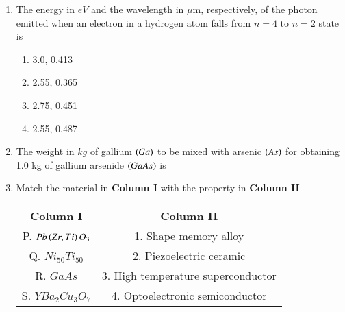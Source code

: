\documentclass[journal,12pt,onecolumn]{IEEEtran}
\theoremstyle{remark}
\begin{document}
\begin{enumerate}
    \item The energy in $eV$ and the wavelength in $\mu$m, respectively, of the photon emitted when an electron
        in a hydrogen atom falls from $n = 4$ to $n = 2$ state is
        \hfill{}
        \begin{multicols}{4}
            \begin{enumerate}
                \item  3.0, 0.413 \columnbreak
                \item  2.55, 0.365 \columnbreak
                \item  2.75, 0.451  \columnbreak
                \item  2.55, 0.487
            \end{enumerate}
        \end{multicols}

    \item  The weight in $kg$ of gallium $\left(Ga\right)$ to be mixed with arsenic $\left(As\right)$ for obtaining 1.0 kg of gallium
        arsenide $\left(GaAs\right)$ is
        \hfill{}

    \item Match the material in \textbf{Column I} with the property in \textbf{Column II}
        \begin{center}
            \begin{tabular}{| c | c |}
        \hline
                \textbf{Column I} & \textbf{Column II}\\
                P. $Pb\left(Zr, Ti\right)O_3$ & 1. Shape memory alloy\\
                \hline
                Q. $Ni_{50}Ti_{50} $ & 2. Piezoelectric ceramic\\
                \hline
                R. $GaAs$ & 3. High temperature superconductor\\
                \hline
                S. $YBa_2Cu_3O_7$ & 4. Optoelectronic semiconductor\\
        \hline
           \end{tabular} 
        \end{center}
        

        \hfill{}
        \begin{enumerate}
        \end{enumerate}


\end{enumerate}
\end{document}

